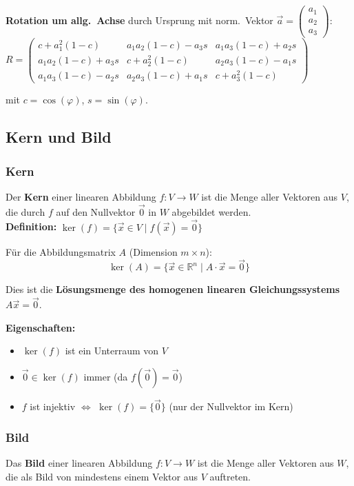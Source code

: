 \textbf{Rotation um allg.\ Achse} durch Ursprung mit norm.\ Vektor $\vec{a}=\begin{pmatrix}a_1\\a_2\\a_3\end{pmatrix}$:
{\tiny
$R = \begin{pmatrix} c+a_1^2(1-c) & a_1a_2(1-c)-a_3s & a_1a_3(1-c)+a_2s \\ a_1a_2(1-c)+a_3s & c+a_2^2(1-c) & a_2a_3(1-c)-a_1s \\ a_1a_3(1-c)-a_2s & a_2a_3(1-c)+a_1s & c+a_3^2(1-c) \end{pmatrix}$
}

mit $c = \cos(\varphi)$, $s = \sin(\varphi)$.

\subsection{Kern und Bild}

\subsubsection*{Kern}
Der \textbf{Kern} einer linearen Abbildung $f: V \to W$ ist die Menge aller Vektoren aus $V$, die durch $f$ auf den Nullvektor $\vec{0}$ in $W$ abgebildet werden. \\[6pt]

\textbf{Definition:} $\ker(f) = \{\vec{x} \in V \mid f(\vec{x}) = \vec{0}\}$

Für die Abbildungsmatrix $A$ (Dimension $m \times n$):
$$\ker(A) = \{\vec{x} \in \mathbb{R}^n \mid A \cdot \vec{x} = \vec{0}\}$$

Dies ist die \textbf{Lösungsmenge des homogenen linearen Gleichungssystems} $A \vec{x} = \vec{0}$.

\textbf{Eigenschaften:}
\begin{itemize}
    \item $\ker(f)$ ist ein Unterraum von $V$
    \item $\vec{0} \in \ker(f)$ immer (da $f(\vec{0}) = \vec{0}$)
    \item $f$ ist injektiv $\Leftrightarrow$ $\ker(f) = \{\vec{0}\}$ (nur der Nullvektor im Kern)
\end{itemize}

\subsubsection*{Bild}
Das \textbf{Bild} einer linearen Abbildung $f: V \to W$ ist die Menge aller Vektoren aus $W$, die als Bild von mindestens einem Vektor aus $V$ auftreten. \\[6pt]

